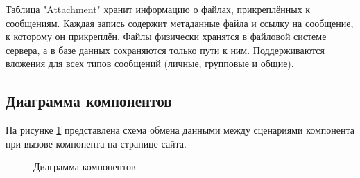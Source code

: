 Таблица "Attachment" хранит информацию о файлах, прикреплённых к сообщениям. Каждая запись содержит метаданные файла и ссылку на сообщение, к которому он прикреплён. Файлы физически хранятся в файловой системе сервера, а в базе данных сохраняются только пути к ним. Поддерживаются вложения для всех типов сообщений (личные, групповые и общие).

\subsection{Диаграмма компонентов}

На рисунке \ref{data:image} представлена схема обмена данными между сценариями компонента при вызове компонента на странице сайта.

\begin{figure}[H]
\caption{Диаграмма компонентов}
\label{data:image}
\end{figure}

